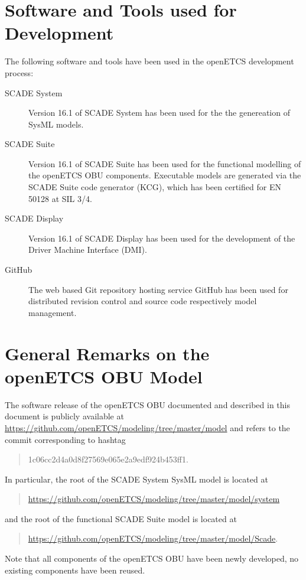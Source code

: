 \section{Software and Tools used for Development}

The following software and tools have been used in the openETCS development process:
\begin{description}
\item[SCADE System] Version 16.1 of SCADE System has been used for the the genereation of SysML models.
\item[SCADE Suite] Version 16.1 of SCADE Suite has been used for the functional modelling of the openETCS OBU components. Executable models are generated via the SCADE Suite code generator (KCG), which has been certified for EN 50128 at SIL 3/4.
\item[SCADE Display] Version 16.1 of SCADE Display has been used for the development of the Driver Machine Interface (DMI).
\item[GitHub] The web based Git repository hosting service GitHub has been used for distributed revision control and source code respectively model management.
\end{description}


\section{General Remarks on the openETCS OBU Model}
The software release of the openETCS OBU documented and described in this document is publicly available at \url{https://github.com/openETCS/modeling/tree/master/model} and refers to the commit corresponding to hashtag 
\begin{quotation}
1c06cc2d4a0d8f27569e065e2a9edf924b453ff1.
\end{quotation}
In particular, the root of the SCADE System SysML model is located at
\begin{quotation}
\url{https://github.com/openETCS/modeling/tree/master/model/system}
\end{quotation}
and the root of the functional SCADE Suite model is located at
\begin{quotation}
\url{https://github.com/openETCS/modeling/tree/master/model/Scade}.
\end{quotation}
Note that all components of the openETCS OBU have been newly developed, no existing components have been reused.